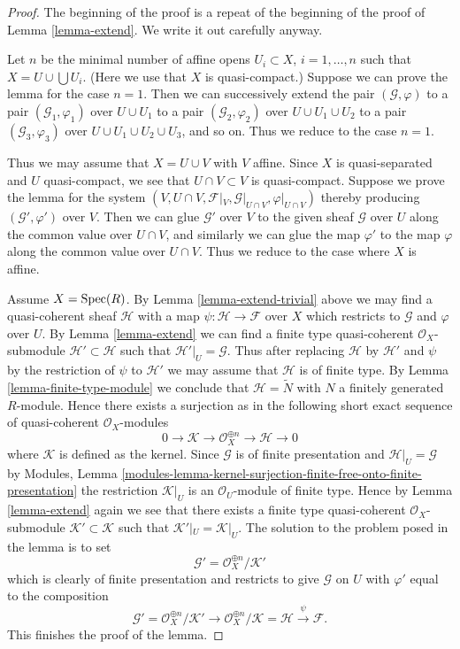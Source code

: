 \begin{proof}
The beginning of the proof is a repeat of the beginning of the
proof of Lemma \ref{lemma-extend}. We write it out carefully anyway.

\medskip\noindent
Let $n$ be the minimal number of affine opens $U_i \subset X$,
$i = 1, \ldots , n$ such that $X = U \cup \bigcup U_i$.
(Here we use that $X$ is quasi-compact.) Suppose
we can prove the lemma for the case $n = 1$. Then we can successively
extend the pair $(\mathcal{G}, \varphi)$
to a pair $(\mathcal{G}_1, \varphi_1)$ over $U \cup U_1$
to a pair $(\mathcal{G}_2, \varphi_2)$ over $U \cup U_1 \cup U_2$
to a pair $(\mathcal{G}_3, \varphi_3)$ over $U \cup U_1 \cup U_2 \cup U_3$,
and so on.
Thus we reduce to the case $n = 1$.

\medskip\noindent
Thus we may assume that $X = U \cup V$ with $V$ affine.
Since $X$ is quasi-separated and $U$ quasi-compact,
we see that $U \cap V \subset V$ is quasi-compact.
Suppose we prove the lemma for the system
$(V, U \cap V, \mathcal{F}|_V, \mathcal{G}|_{U \cap V}, \varphi|_{U \cap V})$
thereby producing $(\mathcal{G}', \varphi')$ over $V$.
Then we can glue $\mathcal{G}'$ over $V$ to the given sheaf $\mathcal{G}$
over $U$ along the common value over $U \cap V$, and similarly we can glue
the map $\varphi'$ to the map $\varphi$ along the common value over
$U \cap V$. Thus we reduce to the case where $X$ is affine.

\medskip\noindent
Assume $X = \mathop{\mathrm{Spec}}(R)$.
By Lemma \ref{lemma-extend-trivial} above we may
find a quasi-coherent sheaf $\mathcal{H}$ with
a map $\psi : \mathcal{H} \to \mathcal{F}$ over $X$
which restricts to $\mathcal{G}$ and $\varphi$ over $U$.
By Lemma \ref{lemma-extend} we can find a finite type
quasi-coherent $\mathcal{O}_X$-submodule
$\mathcal{H}' \subset \mathcal{H}$
such that $\mathcal{H}'|_U = \mathcal{G}$. Thus after
replacing $\mathcal{H}$ by $\mathcal{H}'$
and $\psi$ by the restriction of $\psi$ to $\mathcal{H}'$
we may assume that $\mathcal{H}$ is of finite type.
By Lemma \ref{lemma-finite-type-module}
we conclude that $\mathcal{H} = \widetilde{N}$ with
$N$ a finitely generated $R$-module. Hence there exists a surjection
as in the following short exact sequence of
quasi-coherent $\mathcal{O}_X$-modules
$$
0 \to \mathcal{K} \to \mathcal{O}_X^{\oplus n} \to \mathcal{H} \to 0
$$
where $\mathcal{K}$ is defined as the kernel.
Since $\mathcal{G}$ is of finite presentation and
$\mathcal{H}|_U = \mathcal{G}$ by
Modules, Lemma
\ref{modules-lemma-kernel-surjection-finite-free-onto-finite-presentation}
the restriction $\mathcal{K}|_U$ is
an $\mathcal{O}_U$-module of finite type. Hence by Lemma \ref{lemma-extend}
again we see that there exists a finite type quasi-coherent
$\mathcal{O}_X$-submodule $\mathcal{K}' \subset \mathcal{K}$ such
that $\mathcal{K}'|_U = \mathcal{K}|_U$. The solution to the problem
posed in the lemma is to set
$$
\mathcal{G}' = \mathcal{O}_X^{\oplus n}/\mathcal{K}'
$$
which is clearly of finite presentation and restricts to give $\mathcal{G}$
on $U$ with $\varphi'$ equal to the composition
$$
\mathcal{G}' = \mathcal{O}_X^{\oplus n}/\mathcal{K}'
\to \mathcal{O}_X^{\oplus n}/\mathcal{K} = \mathcal{H} \xrightarrow{\psi}
\mathcal{F}.
$$
This finishes the proof of the lemma.
\end{proof}

